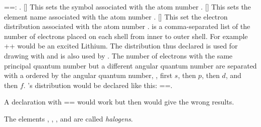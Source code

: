 \documentclass[load-preamble+]{cnltx-doc}
\begin{document}
\begin{commands}
    \verbcode==: .
  []
    This sets the symbol associated with the atom number
    .
  []
    This sets the element name associated with the atom
    number .
  []
    This set the electron distribution associated with the
    atom number .   is a
    comma-separated list of the number of electrons placed on each shell from
    inner to outer shell.  For example
    \verbcode++ would be an excited
    Lithium.  The distribution thus declared is used for drawing with
     and is also used by .  The
    number of electrons with the same principal quantum number but a different
    angular quantum number are separated with a \code{+} ordered by the
    angular quantum number, \ie, first $s$, then $p$, then $d$, and then $f$.
    's distribution would be declared like this:
    \verbcode==.\par
    A declaration with \verbcode== would
    work but then  would give the wrong results.
\end{commands}

\begin{example}
  The elements , , ,
   and  are called \emph{halogens}.
\end{example}
\end{document}
